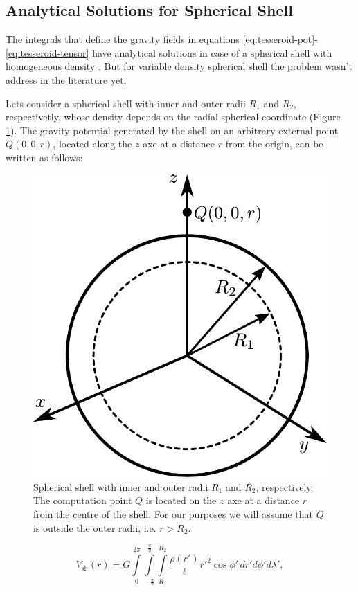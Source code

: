 \documentclass[extra]{gji}
\begin{document}
\subsection{Analytical Solutions for Spherical Shell}

The integrals that define the gravity fields in equations 
\ref{eq:tesseroid-pot}-\ref{eq:tesseroid-tensor} have analytical 
solutions in case of a spherical shell with homogeneous density 
\citep{Mikuska2006,Grombein2013}.
But for variable density spherical shell the problem wasn't address in 
the literature yet.

Lets consider a spherical shell with inner and outer radii $R_1$ and 
$R_2$, respectivetly, whose density depends on the radial spherical 
coordinate (Figure \ref{fig:spherical-shell}).
The gravity potential generated by the shell on an arbitrary external 
point $Q(0,0,r)$, located along the $z$ axe at a distance $r$ from the 
origin, can be written as follows:

\begin{figure}
\centering
\includegraphics[width=0.7\linewidth]{figures/spherical-shell.pdf}
\caption{
    Spherical shell with inner and outer radii $R_1$ and $R_2$, respectively.
    The computation point $Q$ is located on the $z$ axe at a distance $r$ from
    the centre of the shell.
    For our purposes we will assume that $Q$ is outside the outer radii,
    i.e. $r > R_2$.
    }
\label{fig:spherical-shell}
\end{figure}

\begin{equation}
    V_\text{sh}(r) = G 
    \int\limits_0^{2\pi}
    \int\limits_{-\frac{\pi}{2}}^\frac{\pi}{2}
    \int\limits_{R_1}^{R_2}
    \frac{\rho(r')}{\ell} {r'}^2 \cos\phi' \, 
    dr' d\phi' d\lambda',
\end{equation}
\end{document}
